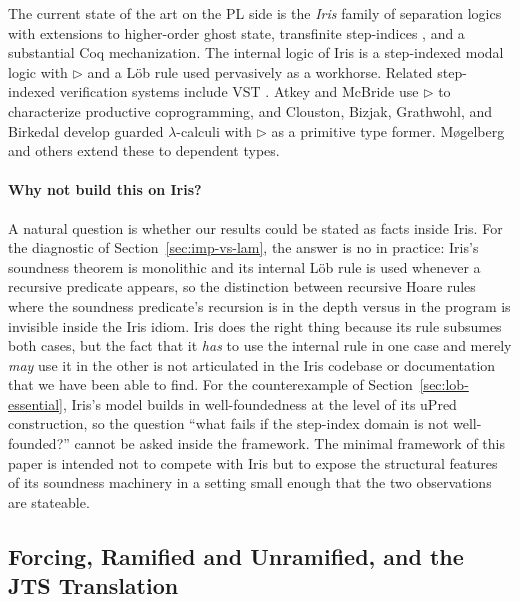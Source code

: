The current state of the art on the PL side is the \emph{Iris} family
of separation logics
\cite{jung-et-al-2018,krebbers-jung-bizjak-birkedal-dreyer-2017} with
extensions to higher-order ghost state, transfinite step-indices
\cite{spies2021transfinite}, and a substantial Coq mechanization.  The
internal logic of Iris is a step-indexed modal logic with $\triangleright$
and a Löb rule used pervasively as a workhorse.  Related step-indexed
verification systems include VST \cite{appel2014vst}.  Atkey and
McBride \citeyearpar{atkey-mcbride2013} use $\triangleright$ to characterize
productive coprogramming, and Clouston, Bizjak, Grathwohl, and
Birkedal \citeyearpar{clouston-et-al-2015,clouston-et-al-2017} develop
guarded $\lambda$-calculi with $\triangleright$ as a primitive type
former. Møgelberg and others \citeyearpar{mogelberg2014,bizjak-mogelberg-2018}
extend these to dependent types.

\paragraph{Why not build this on Iris?}
A natural question is whether our results could be stated as facts
inside Iris.  For the diagnostic of Section~\ref{sec:imp-vs-lam}, the
answer is no in practice: Iris's soundness theorem is monolithic and
its internal Löb rule is used whenever a recursive predicate appears,
so the distinction between recursive Hoare rules where the soundness
predicate's recursion is in the depth versus in the program is
invisible inside the Iris idiom.  Iris does the right thing because
its rule subsumes both cases, but the fact that it \emph{has} to use
the internal rule in one case and merely \emph{may} use it in the
other is not articulated in the Iris codebase or documentation that
we have been able to find.  For the counterexample of
Section~\ref{sec:lob-essential}, Iris's model builds in
well-foundedness at the level of its uPred construction, so the
question ``what fails if the step-index domain is not well-founded?''
cannot be asked inside the framework.  The minimal framework of this
paper is intended not to compete with Iris but to expose the
structural features of its soundness machinery in a setting small
enough that the two observations are stateable.

\subsection{Forcing, Ramified and Unramified, and the JTS Translation}

